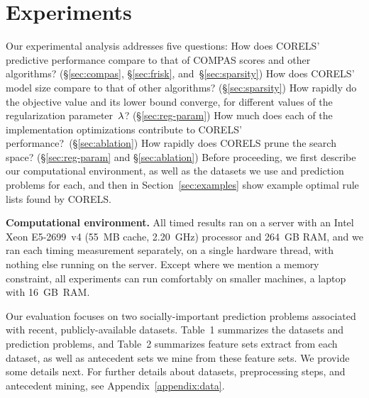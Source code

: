 \section{Experiments}
\label{sec:experiments}

Our experimental analysis addresses five questions:
%
How does CORELS' predictive performance compare to that of COMPAS scores
and other algorithms? (\S\ref{sec:compas}, \S\ref{sec:frisk}, and~\S\ref{sec:sparsity})
%
How does CORELS' model size compare to that of other algorithms? (\S\ref{sec:sparsity})
%
How rapidly do the objective value and its lower bound converge,
for different values of the regularization parameter~${\lambda}$? (\S\ref{sec:reg-param})
%
How much does each of the implementation optimizations contribute to CORELS' performance?~(\S\ref{sec:ablation})
%
How rapidly does CORELS prune the search space? (\S\ref{sec:reg-param} and \S\ref{sec:ablation})
%
Before proceeding, we first describe our computational environment,
as well as the datasets we use and prediction problems for each,
and then in Section~\ref{sec:examples} show example optimal rule lists found by CORELS.

\textbf{Computational environment.}
All timed results ran on a server with an Intel Xeon E5-2699~v4 (55~MB cache, 2.20~GHz) processor and 264~GB RAM,
and we ran each timing measurement separately, on a single hardware thread, with nothing else running on the server.
%
Except where we mention a memory constraint, all experiments
can run comfortably on smaller machines, \eg a laptop with 16~GB~RAM.

Our evaluation focuses on two socially-important prediction problems associated
with recent, publicly-available datasets.
%
Table~1 summarizes the datasets and prediction problems,
and Table~2 summarizes feature sets extract from each dataset,
as well as antecedent sets we mine from these feature sets.
%
We provide some details next.
%
For further details about datasets, preprocessing steps, and antecedent mining,
see Appendix~\ref{appendix:data}.

